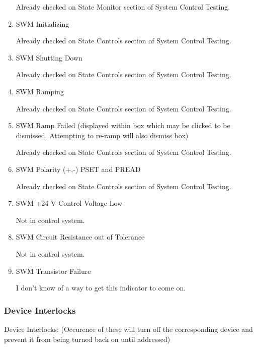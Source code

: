 \documentclass[11pt]{book}		%
\begin{document}
\begin{enumerate}
\color{red}
Already checked on State Monitor section of System Control Testing.
\color{black}

 \item SWM Initializing

\color{red}
Already checked on State Controls section of System Control Testing.
\color{black}

 \item SWM Shutting Down

\color{red}
Already checked on State Controls section of System Control Testing.
\color{black}

 \item SWM Ramping

\color{red}
Already checked on State Controls section of System Control Testing.
\color{black}

 \item SWM Ramp Failed (displayed within box which may be clicked to be dismissed.  Attempting to re-ramp will also dismiss box)

\color{red}
Already checked on State Controls section of System Control Testing.
\color{black}

 \item SWM Polarity (+,-) PSET and PREAD

\color{red}
Already checked on State Controls section of System Control Testing.
\color{black}

 \item SWM +24 V Control Voltage Low

\color{red}
Not in control system.
\color{black}

 \item SWM Circuit Resistance out of Tolerance

\color{red}
Not in control system.
\color{black}

\item SWM Transistor Failure

\color{red}
I don't know of a way to get this indicator to come on.
\color{black}

\end{enumerate}

\subsubsection{Device Interlocks}

Device Interlocks:
(Occurence of these will turn off the corresponding device and prevent it from being turned back on until addressed)
\end{document}
